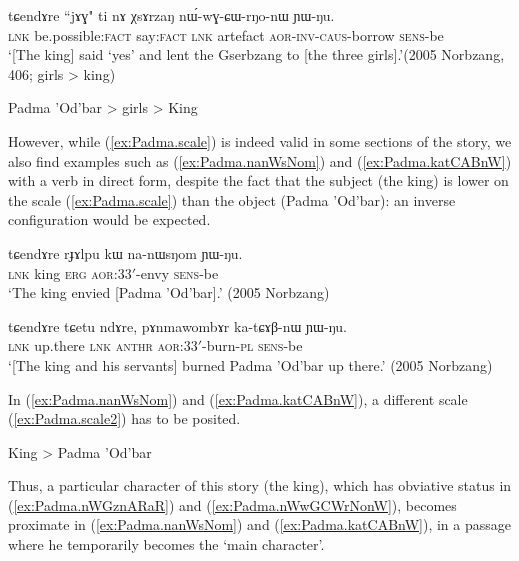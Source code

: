 \begin{exe}
\ex \label{ex:Padma.nWwGCWrNonW}
\gll  tɕendɤre ``jɤɣ" ti nɤ χsɤrzaŋ nɯ́-wɣ-ɕɯ-rŋo-nɯ ɲɯ-ŋu. \\
\textsc{lnk} be.possible:\textsc{fact} say:\textsc{fact} \textsc{lnk} artefact \textsc{aor}-\textsc{inv}-\textsc{caus}-borrow \textsc{sens}-be \\
\glt `[The king] said `yes' and lent the Gserbzang to [the three girls].'(2005 Norbzang, 406; girls > king)
\end{exe}

\begin{exe}
\ex \label{ex:Padma.scale}
\glt Padma 'Od'bar > girls > King
\end{exe}

However, while (\ref{ex:Padma.scale}) is indeed valid in some sections of the story, we also find examples such as (\ref{ex:Padma.nanWsNom}) and (\ref{ex:Padma.katCABnW}) with a verb in direct form, despite the fact that the subject (the king) is lower on the scale (\ref{ex:Padma.scale}) than the object (Padma 'Od'bar): an inverse configuration would be expected.

\begin{exe}
\ex \label{ex:Padma.nanWsNom}
\gll tɕendɤre rɟɤlpu kɯ na-nɯsŋom ɲɯ-ŋu. \\
\textsc{lnk} king \textsc{erg} \textsc{aor}:3\fl{}3$'$-envy \textsc{sens}-be \\
\glt `The king envied [Padma 'Od'bar].' (2005 Norbzang)
\end{exe}

\begin{exe}
\ex \label{ex:Padma.katCABnW}
\gll tɕendɤre tɕetu ndɤre, pɤnmawombɤr ka-tɕɤβ-nɯ ɲɯ-ŋu.  \\
\textsc{lnk} up.there \textsc{lnk}  \textsc{anthr} \textsc{aor}:3\fl{}3$'$-burn-\textsc{pl} \textsc{sens}-be \\
\glt `[The king and his servants] burned Padma 'Od'bar up there.' (2005 Norbzang)
\end{exe}

In (\ref{ex:Padma.nanWsNom}) and (\ref{ex:Padma.katCABnW}), a different scale (\ref{ex:Padma.scale2}) has to be posited.

\begin{exe}
\ex \label{ex:Padma.scale2}
\glt King > Padma 'Od'bar 
\end{exe}
 
Thus, a particular character of this story (the king), which has obviative status in (\ref{ex:Padma.nWGznARaR}) and (\ref{ex:Padma.nWwGCWrNonW}), becomes proximate in (\ref{ex:Padma.nanWsNom}) and (\ref{ex:Padma.katCABnW}), in a passage where he temporarily becomes the `main character'.

